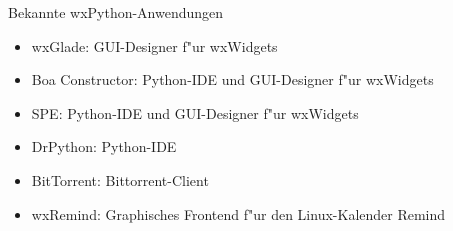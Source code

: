 \begin{frame}{Bekannte wxPython-Anwendungen}
  \begin{itemize}
    \item \alert{wxGlade}: GUI-Designer f"ur wxWidgets
    \item \alert{Boa Constructor}: Python-IDE und GUI-Designer f"ur wxWidgets
    \item \alert{SPE}: Python-IDE und GUI-Designer f"ur wxWidgets
    \item \alert{DrPython}: Python-IDE
    \item \alert{BitTorrent}: Bittorrent-Client
    \item \alert{wxRemind}: Graphisches Frontend f"ur den Linux-Kalender Remind
  \end{itemize}
\end{frame}
